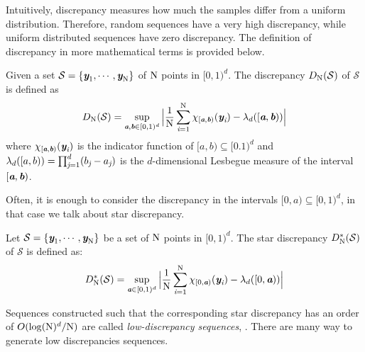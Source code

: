Intuitively, discrepancy measures how much the samples differ from a uniform distribution.
Therefore, random sequences have a very high discrepancy, while uniform distributed sequences have zero discrepancy.
The definition of discrepancy in more mathematical terms is provided below. 
\begin{definition}
Given a set $\mathcal{S} = \{\textit{\textbf{y}}_1, \cdots, \textit{\textbf{y}}_{\textrm{N}}\}$ of $\textrm{N}$ points in $[0,1)^d$. The discrepancy $D_{\textrm{N}}({\mathcal{S}})$ of $\mathcal{S}$ is defined as
\begin{equation}
D_{\textrm{N}}({\mathcal{S}}) = \sup_{\textit{\textbf{a}}, \textit{\textbf{b}}\in[0,1)^d}\Big|\frac{1}{\textrm{N}}\sum_{\textit{i} = 1}^{\textrm{N}}\chi_{[\textit{\textbf{a}},\textit{\textbf{b}})}(\textit{\textbf{y}}_{\textit{i}})-\lambda_d([\textit{\textbf{a}}, \textit{\textbf{b}}))\Big|
\end{equation}
where $\chi_{[\textit{\textbf{a}},\textit{\textbf{b}})}(\textit{\textbf{y}}_{\textit{i}})$ is the indicator function of $[a, b)\subseteq [0.1)^d$ and $\lambda_d([a,b)) = \prod_{\textit{j}=1}^{d}(b_{\textit{j}}-a_{\textit{j}})$ is the $d$-dimensional Lesbegue measure of the interval $[\textit{\textbf{a}},\textit{\textbf{b}})$.
\end{definition}
Often, it is enough to consider the discrepancy in the intervals $[0,a)\subseteq[0,1)^d$, in that case we talk about star discrepancy.
 \begin{definition}
Let $\mathcal{S} = \{\textit{\textbf{y}}_1, \cdots, \textit{\textbf{y}}_{\textrm{N}}\}$ be a set of $\textrm{N}$ points in $[0,1)^d$. The  star discrepancy $D^*_{\textrm{N}}({\mathcal{S}})$ of $\mathcal{S}$ is defined as:
\begin{equation}
D^*_{\textrm{N}}({\mathcal{S}}) = \sup_{\textit{\textbf{a}}\in[0,1)^d}\Big|\frac{1}{\textrm{N}}\sum_{\textit{i} = 1}^{\textrm{N}}\chi_{[0,\textit{\textbf{a}})}(\textit{\textbf{y}}_{\textit{i}})-\lambda_d([0, \textit{\textbf{a}}))\Big|
\end{equation}
\end{definition}
Sequences constructed such that the corresponding star discrepancy has an order of $O(\log(\textrm{N})^d/\textrm{N})$ are called \textit{low-discrepancy sequences}, \cite{owen2003quasi}.
There are many way to generate low discrepancies sequences.
